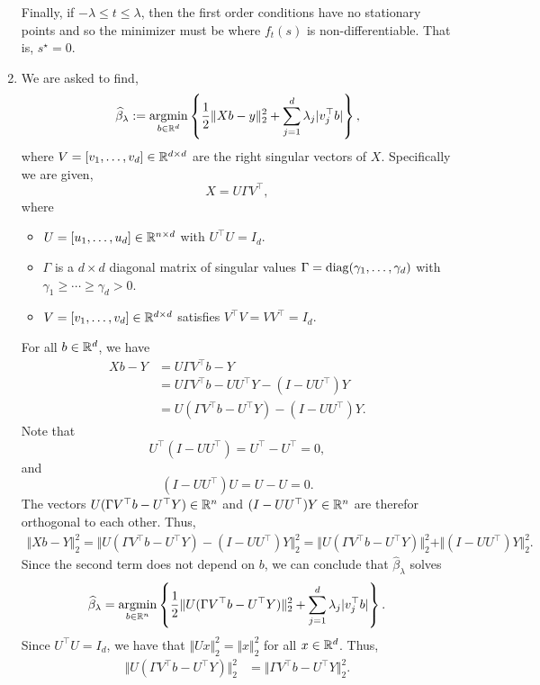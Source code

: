 \begin{enumerate}[label = (\alph*)]
    Finally, if $-\lambda \le t \le \lambda$, then the first order conditions have no stationary points and so the minimizer must be where $f_t(s)$ is non-differentiable. That is, $s^\star = 0$.
    \item We are asked to find,
    \[\widehat{\beta}_\lambda := \operatorname*{argmin}_{b \in \mathbb{R}^d}\left\{\frac{1}{2}\Vert Xb - y \Vert_2^2 + \sum_{j=1}^d \lambda_j |v_j^\top b |\right\}, \]
    where $V = [v_1, \ldots, v_d] \in \mathbb{R}^{d \times d}$ are the right singular vectors of $X$. Specifically we are given,
    \[X = U\Gamma V^\top, \]
    where
    \begin{itemize}
        \item $U =[u_1,\ldots, u_d]\in \mathbb{R}^{n \times d}$ with $U^\top U = I_{d}$.
        \item $\Gamma$ is a $d \times d$ diagonal matrix of singular values $\Gamma=\operatorname{diag}(\gamma_1,\ldots,\gamma_d)$ with $\gamma_1 \ge \cdots \ge \gamma_d > 0$.
        \item $V = [v_1, \ldots, v_d] \in \mathbb{R}^{d \times d}$ satisfies $V^\top V =VV^\top = I_d$. 
    \end{itemize}
    For all $b \in \mathbb{R}^d$, we have
    \begin{align*}
        Xb - Y &= U\Gamma V^\top b - Y\\
        &=U\Gamma V^\top b - UU^\top Y - (I-UU^\top)Y\\
        &=U(\Gamma V^\top b - U^\top Y) - (I-UU^\top)Y.
    \end{align*}
    Note that
    \[U^\top(I-UU^\top) =U^\top - U^\top = 0,  \]
    and
    \[(I-UU^\top)U = U-U=0.\]
    The vectors $U(\Gamma V^\top b-U^\top Y) \in \mathbb{R}^n$ and $(I-UU^\top)Y \in \mathbb{R}^n$ are therefor orthogonal to each other. Thus,
    \begin{align*}\Vert Xb - Y \Vert_2^2 = \Vert U(\Gamma V^\top b - U^\top Y) - (I-UU^\top)Y\Vert_2^2 = \Vert U(\Gamma V^\top b - U^\top Y)\Vert_2^2 + \Vert (I-UU^\top)Y\Vert_2^2.
    \end{align*}
    Since the second term does not depend on $b$, we can conclude that $\widehat{\beta}_\lambda$ solves
    \[\widehat{\beta}_\lambda = \operatorname*{argmin}_{b \in \mathbb{R}^n}\left\{\frac{1}{2}\Vert U (\Gamma V^\top b - U^\top Y)\Vert_2^2 + \sum_{j=1}^d \lambda_j |v_j^\top b|\right\}. \]
    Since $U^\top U = I_d$, we have that $\Vert Ux\Vert_2^2 = \Vert x \Vert_2^2$ for all $x \in \mathbb{R}^d$. Thus,
    \begin{align*}
        \Vert U (\Gamma V^\top b - U^\top Y)\Vert_2^2 &= \Vert \Gamma V^\top b - U^\top Y \Vert_2^2.

\end{align*}
\end{enumerate}
